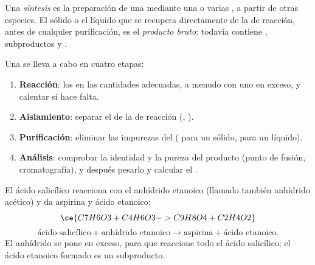 \begin{definition}\label{def:g10:synthesis-yield:synthesis}
Una \emph{síntesis} es la preparación de una  mediante una o varias , a partir de otras
especies. El sólido o el líquido que se recupera directamente de la
 de reacción, antes de cualquier purificación, es el
\emph{producto bruto}: todavía contiene ,
subproductos y .
\end{definition}

\begin{method}\label{met:g10:synthesis-yield:plan}
Una  se lleva a cabo en cuatro etapas:
\begin{enumerate}
  \item \textbf{Reacción}:  los  en las cantidades
        adecuadas, a menudo con uno en exceso, y calentar si hace falta.
  \item \textbf{Aislamiento}: separar el  de la  de
        reacción (, ).
  \item \textbf{Purificación}: eliminar las impurezas del 
        ( para un sólido,  para un líquido).
  \item \textbf{Análisis}: comprobar la identidad y la pureza del
        producto (punto de fusión, cromatografía), y después pesarlo y
        calcular el .
\end{enumerate}
\end{method}

\begin{example}\label{ex:g10:synthesis-yield:aspirin}
El ácido salicílico reacciona con el anhídrido etanoico (llamado también
anhídrido acético) y da aspirina y ácido etanoico:
\[
  \ce{C7H6O3 + C4H6O3 -> C9H8O4 + C2H4O2}
\]
\[
  \text{ácido salicílico} + \text{anhídrido etanoico} \longrightarrow
  \text{aspirina} + \text{ácido etanoico}.
\]
El anhídrido se pone en exceso, para que reaccione todo el ácido
salicílico; el ácido etanoico formado es un subproducto.
\end{example}

